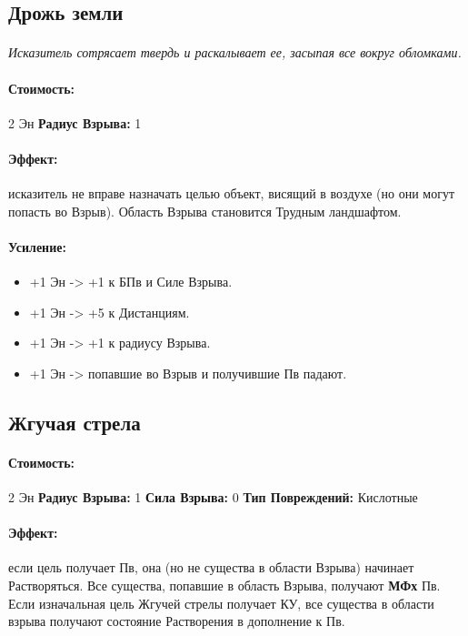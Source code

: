 \subsection{Дрожь земли}
\paragraph{} 
\textit{Исказитель сотрясает твердь и раскалывает ее, засыпая все вокруг обломками.}
\paragraph{Стоимость: }2 Эн
\newline
\textbf{Радиус Взрыва: }1
\paragraph{Эффект: }исказитель не вправе назначать целью объект, висящий в воздухе (но они могут попасть во Взрыв). Область Взрыва становится Трудным ландшафтом.
\paragraph{Усиление:}
\begin{itemize}
\item+1 Эн -> +1 к БПв и Силе Взрыва.
\item+1 Эн -> +5 к Дистанциям.
\item+1 Эн -> +1 к радиусу Взрыва.
\item+1 Эн -> попавшие во Взрыв и получившие Пв падают.
\end{itemize}
\subsection{Жгучая стрела}
\paragraph{} 
\textit{
\tbd}
\paragraph{Стоимость: }2 Эн
\newline
\textbf{Радиус Взрыва: }1
\newline
\textbf{Сила Взрыва: }0
\newline
\textbf{Тип Повреждений: }Кислотные
\paragraph{Эффект: }если цель получает Пв, она (но не существа в области Взрыва) начинает Растворяться. 
\newline Все существа, попавшие в область Взрыва, получают 
\textbf{МФх} Пв. Если изначальная цель Жгучей стрелы получает КУ, все существа в области взрыва получают состояние Растворения в дополнение к Пв.
